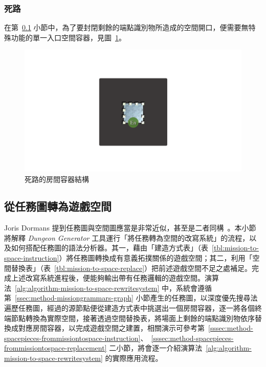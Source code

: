 \subsubsection{死路}
\label{sssec:method-spacepieces-types-wall}

在第~\ref{ssec:method-spacepieces-frommissiontospace} 小節中，為了要封閉剩餘的端點識別物所造成的空間開口，便需要無特殊功能的單一入口空間容器，見圖~\ref{fig:roomtype-wall}。

\begin{figure}[!htb]
  \begin{center}
    \includegraphics[width=1.0\textwidth]{figures/roomtype-wall.pdf}
    \caption{死路的房間容器結構}
    \label{fig:roomtype-wall}
  \end{center}
\end{figure}

\subsection{從任務圖轉為遊戲空間}
\label{ssec:method-spacepieces-frommissiontospace}

Joris Dormans 提到任務圖與空間圖應當是非常近似，甚至是二者同構~\cite{dormans2010adventures}。本小節將解釋 \textit{Dungeon Generator} 工具運行「將任務轉為空間的改寫系統」的流程，以及如何搭配任務圖的語法分析器。其一，藉由「建造方式表」（表~\ref{tbl:mission-to-space-instruction}）將任務圖轉換成有意義拓撲關係的遊戲空間；其二，利用「空間替換表」（表~\ref{tbl:mission-to-space-replace}）把前述遊戲空間不足之處補足。完成上述改寫系統進程後，便能夠輸出帶有任務邏輯的遊戲空間。演算法~\ref{alg:algorithm-mission-to-space-rewritesystem} 中，系統會遵循第~\ref{ssec:method-missiongrammars-graph} 小節產生的任務圖，以深度優先搜尋法遍歷任務圖，經過的源節點便從建造方式表中挑選出一個房間容器，逐一將各個終端節點轉換為實際空間，接著透過空間替換表，將場面上剩餘的端點識別物依序替換成對應房間容器，以完成遊戲空間之建置，相關演示可參考第~\ref{sssec:method-spacepieces-frommissiontospace-instruction}、~\ref{sssec:method-spacepieces-frommissiontospace-replacement} 二小節，將會逐一介紹演算法~\ref{alg:algorithm-mission-to-space-rewritesystem} 的實際應用流程。

